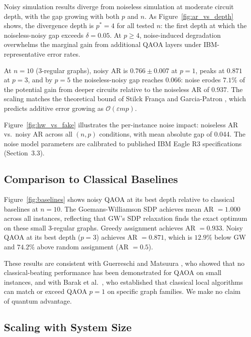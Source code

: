 \documentclass[12pt]{article}
\begin{document}
Noisy simulation results diverge from noiseless simulation at moderate circuit depth, with the gap growing with both $p$ and $n$. As Figure~\ref{fig:ar_vs_depth} shows, the divergence depth is $p^* = 4$ for all tested $n$: the first depth at which the noiseless-noisy gap exceeds $\delta = 0.05$. At $p \geq 4$, noise-induced degradation overwhelms the marginal gain from additional QAOA layers under IBM-representative error rates.

At $n = 10$ (3-regular graphs), noisy AR is $0.766 \pm 0.007$ at $p = 1$, peaks at $0.871$ at $p = 3$, and by $p = 5$ the noiseless-noisy gap reaches $0.066$: noise erodes $7.1\%$ of the potential gain from deeper circuits relative to the noiseless AR of $0.937$. The scaling matches the theoretical bound of Stilck Fran\c{c}a and Garcia-Patron \cite{stilckfranca2021limitations}, which predicts additive error growing as $\mathcal{O}(\varepsilon m p)$.

Figure~\ref{fig:hw_vs_fake} illustrates the per-instance noise impact: noiseless AR vs.\ noisy AR across all $(n,p)$ conditions, with mean absolute gap of 0.044. The noise model parameters are calibrated to published IBM Eagle R3 specifications (Section~3.3).

\subsection{Comparison to Classical Baselines}

Figure~\ref{fig:baselines} shows noisy QAOA at its best depth relative to classical baselines at $n = 10$. The Goemans-Williamson SDP achieves mean AR $= 1.000$ across all instances, reflecting that GW's SDP relaxation finds the exact optimum on these small 3-regular graphs. Greedy assignment achieves AR $= 0.933$. Noisy QAOA at its best depth ($p = 3$) achieves AR $= 0.871$, which is $12.9\%$ below GW and $74.2\%$ above random assignment (AR $= 0.5$).

These results are consistent with Guerreschi and Matsuura \cite{guerreschi2019qaoa}, who showed that no classical-beating performance has been demonstrated for QAOA on small instances, and with Barak et al.\ \cite{barak2021classical}, who established that classical local algorithms can match or exceed QAOA $p = 1$ on specific graph families. We make no claim of quantum advantage.

\subsection{Scaling with System Size}
\end{document}
